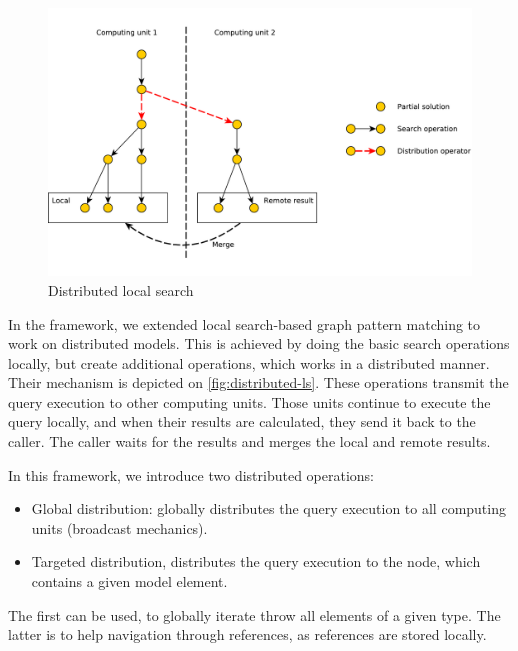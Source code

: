 \begin{figure}[h]
	\begin{center}
		\includegraphics[width=\textwidth]{figures/distributed-ls.pdf}
		\caption{Distributed local search}
		\label{fig:distributed-ls}
	\end{center}
\end{figure}

In the framework, we extended local search-based graph pattern matching to work on distributed models.
This is achieved by doing the basic search operations locally, but create additional operations, which works in a distributed manner. 
Their mechanism is depicted on \autoref{fig:distributed-ls}.
These operations transmit the query execution to other computing units.
Those units continue to execute the query locally, and when their results are calculated, they send it back to the caller.
The caller waits for the results and merges the local and remote results.

In this framework, we introduce two distributed operations:
\begin{itemize}
	\item Global distribution: globally distributes the query execution to all computing units (broadcast mechanics).
	\item Targeted distribution, distributes the query execution to the node, which contains a given model element.
\end{itemize}

The first can be used, to globally iterate throw all elements of a given type. The latter is to help navigation through references, as references are stored locally.





